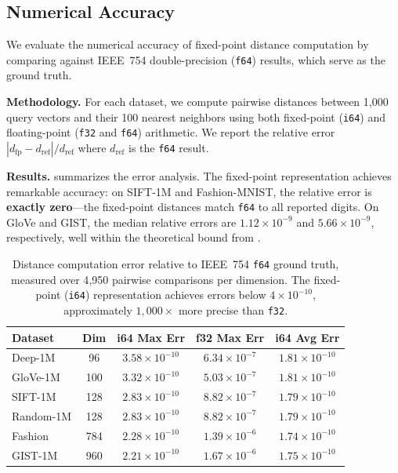 \documentclass[10pt,journal]{IEEEtran}
\begin{document}
\subsection{Numerical Accuracy}
\label{sec:error_exp}

We evaluate the numerical accuracy of fixed-point distance computation by comparing against IEEE~754 double-precision (\texttt{f64}) results, which serve as the ground truth.

\textbf{Methodology.} For each dataset, we compute pairwise distances between 1{,}000 query vectors and their 100 nearest neighbors using both fixed-point (\texttt{i64}) and floating-point (\texttt{f32} and \texttt{f64}) arithmetic. We report the relative error $|d_{\text{fp}} - d_{\text{ref}}| / d_{\text{ref}}$ where $d_{\text{ref}}$ is the \texttt{f64} result.

\textbf{Results.}  summarizes the error analysis. The fixed-point representation achieves remarkable accuracy: on SIFT-1M and Fashion-MNIST, the relative error is \textbf{exactly zero}---the fixed-point distances match \texttt{f64} to all reported digits. On GloVe and GIST, the median relative errors are $1.12 \times 10^{-9}$ and $5.66 \times 10^{-9}$, respectively, well within the theoretical bound from .

\begin{table}[t]
  \centering
  \caption{Distance computation error relative to IEEE~754 \texttt{f64} ground truth, measured over 4{,}950 pairwise comparisons per dimension. The fixed-point (\texttt{i64}) representation achieves errors below $4 \times 10^{-10}$, approximately $1{,}000\times$ more precise than \texttt{f32}.}
  \label{tab:error}
  \begin{tabular}{lcccc}
    \toprule
    \textbf{Dataset} & \textbf{Dim} & \textbf{i64 Max Err} & \textbf{f32 Max Err} & \textbf{i64 Avg Err} \\
    \midrule
    Deep-1M   & 96  & $3.58\times10^{-10}$ & $6.34\times10^{-7}$ & $1.81\times10^{-10}$ \\
    GloVe-1M  & 100 & $3.32\times10^{-10}$ & $5.03\times10^{-7}$ & $1.81\times10^{-10}$ \\
    SIFT-1M   & 128 & $2.83\times10^{-10}$ & $8.82\times10^{-7}$ & $1.79\times10^{-10}$ \\
    Random-1M & 128 & $2.83\times10^{-10}$ & $8.82\times10^{-7}$ & $1.79\times10^{-10}$ \\
    Fashion   & 784 & $2.28\times10^{-10}$ & $1.39\times10^{-6}$ & $1.74\times10^{-10}$ \\
    GIST-1M   & 960 & $2.21\times10^{-10}$ & $1.67\times10^{-6}$ & $1.75\times10^{-10}$ \\
    \bottomrule
  \end{tabular}
\end{table}
\end{document}
